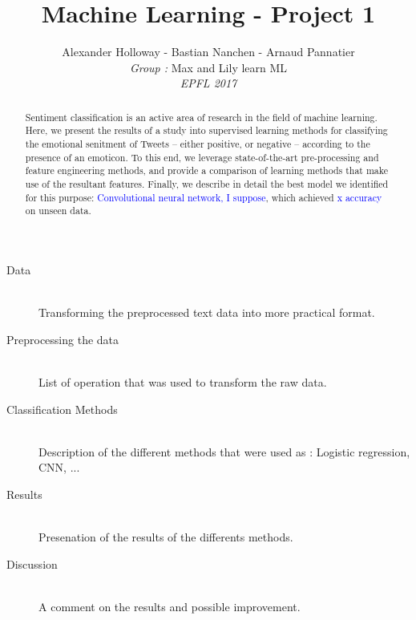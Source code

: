 \documentclass[10pt,conference,compsocconf]{IEEEtran}
\begin{document}
\title{Machine Learning - Project 1}
\author{
 Alexander Holloway - Bastian Nanchen - Arnaud Pannatier 
  \\
  \textit{Group : }Max and Lily learn ML \\
  \textit{EPFL 2017}
}
\maketitle

\begin{abstract}
Sentiment classification is an active area of research in the field of machine learning. Here, we present the results of a study into supervised learning methods for classifying the emotional senitment of Tweets -- either positive, or negative -- according to the presence of an emoticon. To this end, we leverage state-of-the-art pre-processing and feature engineering methods, and provide a comparison of learning methods that make use of the resultant features. Finally, we describe in detail the best model we identified for this purpose: \textcolor{blue}{Convolutional neural network, I suppose}, which achieved \textcolor{blue}{x accuracy} on unseen data.
\end{abstract}

\begin{description}
\item[Data] \ \\
Transforming the preprocessed text data into more practical format. 
\item[Preprocessing the data] \ \\
List of operation that was used to transform the raw data.
\item[Classification Methods] \ \\
Description of the different methods that were used as : Logistic regression, CNN, ...
\item[Results] \ \\
Presenation of the results of the differents methods.
\item[Discussion] \ \\
 A comment on the results and possible improvement.  
\end{description}









\end{document}
